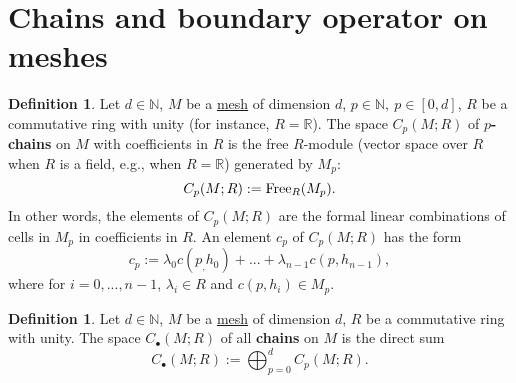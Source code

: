 \documentclass[fleqn]{article}
\theoremstyle{definition}
\newtheorem{definition}[theorem]{Definition}
\newcommand{\N}{\mathbb{N}}
\newcommand{\R}{\mathbb{R}}
\begin{document}
\section{Chains and boundary operator on meshes}

\begin{definition}
  \label{idec:mesh_chain:definition}
  Let
    $d \in \N$,
    $M$ be a \hyperref[idec:mesh:definition]{mesh} of dimension $d$,
    $p \in \N,\ p \in [0, d]$,
    $R$ be a commutative ring with unity (for instance, $R = \R$).
  The space $C_p(M; R)$ of \textbf{$p$-chains}
  on $M$ with coefficients in $R$ is the free $R$-module
  (vector space over $R$ when $R$ is a field, e.g., when $R = \R$)
  generated by $M_p$:
  \begin{equation}
    C_p(M; R) := {\rm Free}_R(M_p).
  \end{equation}
  In other words, the elements of $C_p(M; R)$ are the formal linear combinations
  of cells in $M_p$ in coefficients in $R$.
  An element $c_p$ of $C_p(M; R)$ has the form
  \begin{equation}
    c_p := \lambda_0 c(p_, h_0) + ... + \lambda_{n - 1} c(p, h_{n - 1}),
  \end{equation}
  where for $i = 0, ..., n - 1$, $\lambda_i \in R$ and $c(p, h_i) \in M_p$.
\end{definition}

\begin{definition}
  Let
    $d \in \N$,
    $M$ be a \hyperref[idec:mesh:definition]{mesh} of dimension $d$,
    $R$ be a commutative ring with unity.
  The space $C_\bullet(M; R)$ of all \textbf{chains} on $M$ is the direct sum
  \begin{equation}
    C_\bullet(M; R) := \bigoplus_{p = 0}^d
    \hyperref[idec:mesh_chain:definition]{C_p(M; R)}.
  \end{equation}
\end{definition}
\end{document}
